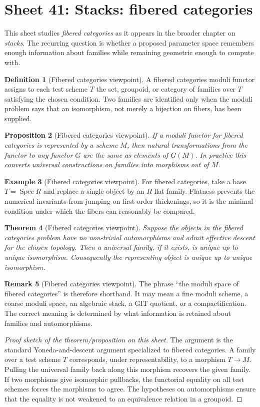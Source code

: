 \documentclass[11pt]{amsart}
\newtheorem{theorem}{Theorem}[section]
\newtheorem{proposition}[theorem]{Proposition}
\theoremstyle{definition}
\newtheorem{definition}[theorem]{Definition}
\newtheorem{example}[theorem]{Example}
\newtheorem{remark}[theorem]{Remark}
\newcommand{\Spec}{\operatorname{Spec}}
\begin{document}
\section{Sheet 41: Stacks: fibered categories}
This sheet studies \emph{fibered categories} as it appears in the broader chapter on \emph{stacks}.  The recurring question is whether a proposed parameter space remembers enough information about families while remaining geometric enough to compute with.
\begin{definition}[Fibered categories viewpoint]
A fibered categories moduli functor assigns to each test scheme $T$ the set, groupoid, or category of families over $T$ satisfying the chosen condition.  Two families are identified only when the moduli problem says that an isomorphism, not merely a bijection on fibers, has been supplied.
\end{definition}
\begin{proposition}[Fibered categories viewpoint]
If a moduli functor for fibered categories is represented by a scheme $M$, then natural transformations from the functor to any functor $G$ are the same as elements of $G(M)$.  In practice this converts universal constructions on families into morphisms out of $M$.
\end{proposition}
\begin{example}[Fibered categories viewpoint]
For fibered categories, take a base $T=\Spec R$ and replace a single object by an $R$-flat family.  Flatness prevents the numerical invariants from jumping on first-order thickenings, so it is the minimal condition under which the fibers can reasonably be compared.
\end{example}
\begin{theorem}[Fibered categories viewpoint]
Suppose the objects in the fibered categories problem have no non-trivial automorphisms and admit effective descent for the chosen topology.  Then a universal family, if it exists, is unique up to unique isomorphism.  Consequently the representing object is unique up to unique isomorphism.
\end{theorem}
\begin{remark}[Fibered categories viewpoint]
The phrase ``the moduli space of fibered categories'' is therefore shorthand.  It may mean a fine moduli scheme, a coarse moduli space, an algebraic stack, a GIT quotient, or a compactification.  The correct meaning is determined by what information is retained about families and automorphisms.
\end{remark}
\begin{proof}[Proof sketch of the theorem/proposition on this sheet]
The argument is the standard Yoneda-and-descent argument specialized to fibered categories.  A family over a test scheme $T$ corresponds, under representability, to a morphism $T\to M$.  Pulling the universal family back along this morphism recovers the given family.  If two morphisms give isomorphic pullbacks, the functorial equality on all test schemes forces the morphisms to agree.  The hypotheses on automorphisms ensure that the equality is not weakened to an equivalence relation in a groupoid.
\end{proof}
\end{document}
